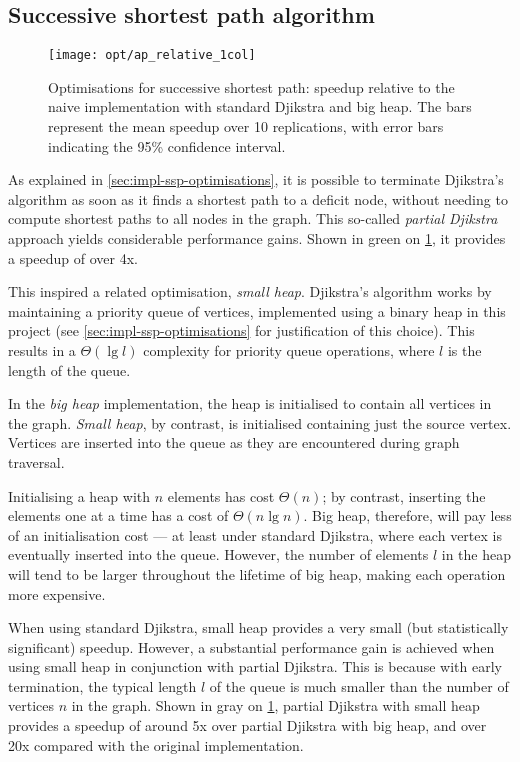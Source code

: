 \subsection{Successive shortest path algorithm}

\begin{figure}
    \centering
    \texttt{[image: opt/ap\_relative\_1col]}
    \caption[Optimisations for successive shortest path]{Optimisations for successive shortest path: speedup relative to the naive implementation with standard Djikstra and big heap. The bars represent the mean speedup over 10 replications, with error bars indicating the 95\% confidence interval.}
    \label{fig:opt-ap}
\end{figure}

As explained in \cref{sec:impl-ssp-optimisations}, it is possible to terminate Djikstra's algorithm as soon as it finds a shortest path to a deficit node, without needing to compute shortest paths to all nodes in the graph. This so-called \emph{partial Djikstra} approach yields considerable performance gains. Shown in green on \cref{fig:opt-ap}, it provides a speedup of over 4x.

This inspired a related optimisation, \emph{small heap}. Djikstra's algorithm works by maintaining a priority queue of vertices, implemented using a binary heap in this project (see \cref{sec:impl-ssp-optimisations} for justification of this choice). This results in a $\Theta\left(\lg l\right)$ complexity for priority queue operations, where $l$ is the length of the queue.

In the \emph{big heap} implementation, the heap is initialised to contain all vertices in the graph. \emph{Small heap}, by contrast, is initialised containing just the source vertex. Vertices are inserted into the queue as they are encountered during graph traversal.

Initialising a heap with $n$ elements has cost $\Theta(n)$; by contrast, inserting the elements one at a time has a cost of $\Theta(n\lg n)$. Big heap, therefore, will pay less of an initialisation cost --- at least under standard Djikstra, where each vertex is eventually inserted into the queue. However, the number of elements $l$ in the heap will tend to be larger throughout the lifetime of big heap, making each operation more expensive.

When using standard Djikstra, small heap provides a very small (but statistically significant) speedup. However, a substantial performance gain is achieved when using small heap in conjunction with partial Djikstra. This is because with early termination, the typical length $l$ of the queue is much smaller than the number of vertices $n$ in the graph. Shown in gray on \cref{fig:opt-ap}, partial Djikstra with small heap provides a speedup of around 5x over partial Djikstra with big heap, and over 20x compared with the original implementation.

